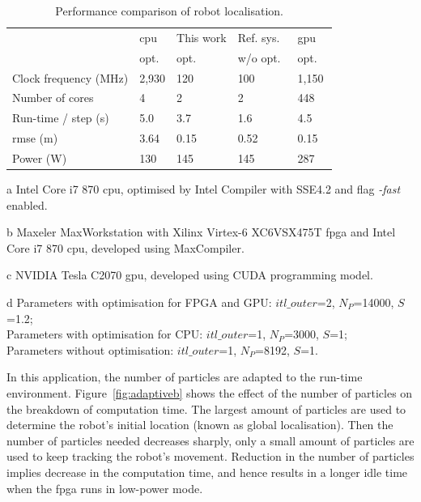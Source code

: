 \begin{table}[ht]
	\setlength{\tabcolsep}{2pt}
	\begin{spacing}{1.0}
	\caption{Performance comparison of robot localisation.}
	\label{tab:perf_mcl1}
	\centering
	\smallskip
	\begin{threeparttable}
		\begin{tabular}{l|x{3cm}y{3cm}x{3cm}x{3cm}}
			\hline
															& \gls{cpu} 							& This work  				& Ref. sys.~\cite{chau14trets}  	& \gls{gpu} \\
															& opt.~		&	opt.~		& w/o opt.~		& opt. ~ \\
			\hline
			\hline
			Clock frequency (MHz) 	& 2,930 & 120 	& 100 	& 1,150 \\
			Number of cores					& 4		& 2 	& 2 	& 448 \\
			\hline
			\hline
			Run-time / step (s) 	& 5.0	& 3.7	& 1.6			& 4.5 \\
			\gls{rmse} (m)								& 3.64	& 0.15	& 0.52	& 0.15 \\
			Power (W)								& 130		& 145 	& 145		& 287 \\
			\hline
		\end{tabular}
		\begin{tablenotes}
		\item[a] Intel Core i7 870 \gls{cpu}, optimised by Intel Compiler with SSE4.2 and flag {\it -fast} enabled.
		\item[b] Maxeler MaxWorkstation with Xilinx Virtex-6 XC6VSX475T \gls{fpga} and Intel Core i7 870 \gls{cpu}, developed using MaxCompiler.
		\item[c] NVIDIA Tesla C2070 \gls{gpu}, developed using CUDA programming model.
		\item[d] Parameters with optimisation for FPGA and GPU: $itl\_outer$=2, $N_P$=14000, $S$=1.2; \\ Parameters with optimisation for CPU: $itl\_outer$=1, $N_P$=3000, $S$=1; \\ Parameters without optimisation: $itl\_outer$=1, $N_P$=8192, $S$=1. 
		\end{tablenotes}
	\end{threeparttable}
	\end{spacing}
\end{table}

In this application, the number of particles are adapted to the run-time environment.
Figure~\ref{fig:adaptiveb} shows the effect of the number of particles on the breakdown of computation time.
The largest amount of particles are used to determine the robot's initial location (known as global localisation).
Then the number of particles needed decreases sharply, only a small amount of particles are used to keep tracking the robot's movement.
Reduction in the number of particles implies decrease in the computation time, and hence results in a longer idle time when the \gls{fpga} runs in low-power mode.

